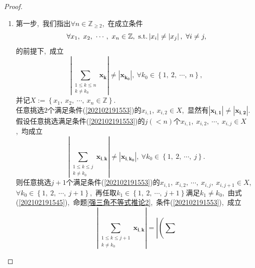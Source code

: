 \documentclass[UTF8, twoside]{ctexart}
\theoremstyle{nonumberplain}
\newtheorem{proof}{\heiti 证明}  %
\theoremstyle{nonumberplain}
\theoremstyle{plain}
\begin{document}
	\begin{proof}
		\ 
		\begin{enumerate}
			\item 第一步,\ 我们指出$\forall n\in {{\mathbb{Z}}_{\ge 2}}$,\ 在成立条件
			\begin{equation} \label{202102191553}
				\forall {{x}_{1}},\ {{x}_{2}},\ \cdots,\  {{x}_{n}}\in \mathbb{Z},\ \textup{s.t.}
				\left| {{x}_{i}} \right|\ne \left| {{x}_{j}} \right|,\ \forall i\ne j,
			\end{equation}
			的前提下,\ 成立
			\begin{equation} \label{202102190114}
					\left| \sum\limits_{\begin{smallmatrix} 
							1\le k\le n \\ 
							k\ne {{k}_{0}} 
					\end{smallmatrix}}^{{}}\bm{{{x}_{k}}} \right|\ne \left| \bm{{x}_{{{k}_{0}}}} \right|,\ 
				\forall {{k}_{0}}\in \left\{ 1,\ 2,\ \cdots ,\ n \right\},
			\end{equation}
			并记$X:=\left\{ {{x}_{1}},\ {{x}_{2}},\  \cdots ,\ {{x}_{n}}\in \mathbb{Z} \right\}$.\\
			任意挑选$2$个满足条件(\ref{202102191553})的${{x}_{i,1}},\ {{x}_{i,2}}\in X$,\ 显然有$\left| \bm{{x}_{i,1}} \right|\ne \left| \bm{{x}_{i,2}} \right|$. \\
			假设任意挑选满足条件(\ref{202102191553})的$j\left( <n \right)$个${{x}_{i,1}},\ {{x}_{i,2}},\ \cdots ,\ {{x}_{i,j}}\in X$,\ 均成立
			\begin{equation} \label{202102191545}
				\left| \sum\limits_{\begin{smallmatrix} 
						1\le k\le j \\ 
						k\ne {{k}_{0}} 
				\end{smallmatrix}}^{{}}\bm{{{x}_{i,k}}} \right|\ne \left| \bm{{x}_{i,{{k}_{0}}}} \right|,
			\ \forall {{k}_{0}}\in \left\{ 1,\ 2,\ \cdots ,\ j \right\}.
			\end{equation}
			则任意挑选$j+1$个满足条件(\ref{202102191553})的${{x}_{i,1}},\ {{x}_{i,2}},\ \cdots ,\ {{x}_{i,j}},\ {{x}_{i,j+1}}\in X$,\ $\forall {{k}_{0}}\in \left\{ 1,\ 2,\ \cdots ,\ j+1 \right\}$,\ 再任取${{k}_{1}}\in \left\{ 1,\ 2,\ \cdots ,\ j+1 \right\}$满足${{k}_{1}}\ne {{k}_{0}}$,\ 由式(\ref{202102191545}),\ 命题\ref{强三角不等式推论2},\ 条件(\ref{202102191553}),\ 成立
			\[
				\left| \sum\limits_{\begin{smallmatrix} 
						1\le k\le j+1 \\ 
						k\ne {{k}_{0}} 
				\end{smallmatrix}}^{{}}\bm{{{x}_{i,k}}} \right|=\left|\left( \sum\limits_{\begin{smallmatrix} 

\end{smallmatrix}}\]
\end{enumerate}
\end{proof}
\end{document}
